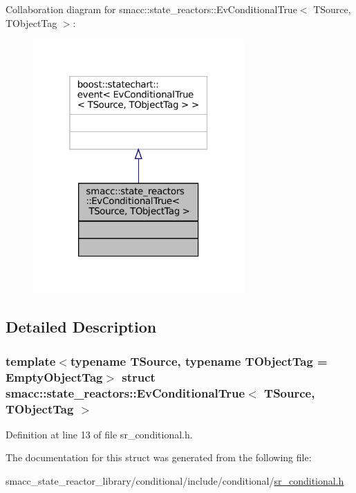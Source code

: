 Collaboration diagram for smacc\+:\+:state\+\_\+reactors\+:\+:Ev\+Conditional\+True$<$ T\+Source, T\+Object\+Tag $>$\+:
\nopagebreak
\begin{figure}[H]
\begin{center}
\leavevmode
\includegraphics[width=229pt]{structsmacc_1_1state__reactors_1_1EvConditionalTrue__coll__graph}
\end{center}
\end{figure}


\subsection{Detailed Description}
\subsubsection*{template$<$typename T\+Source, typename T\+Object\+Tag = Empty\+Object\+Tag$>$\newline
struct smacc\+::state\+\_\+reactors\+::\+Ev\+Conditional\+True$<$ T\+Source, T\+Object\+Tag $>$}



Definition at line 13 of file sr\+\_\+conditional.\+h.



The documentation for this struct was generated from the following file\+:\begin{DoxyCompactItemize}
\item 
smacc\+\_\+state\+\_\+reactor\+\_\+library/conditional/include/conditional/\hyperlink{sr__conditional_8h}{sr\+\_\+conditional.\+h}\end{DoxyCompactItemize}
